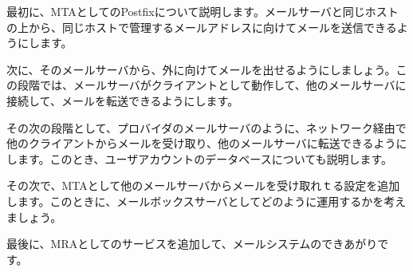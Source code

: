 最初に、MTAとしてのPostfixについて説明します。メールサーバと同じホストの上から、同じホストで管理するメールアドレスに向けてメールを送信できるようにします。

次に、そのメールサーバから、外に向けてメールを出せるようにしましょう。この段階では、メールサーバがクライアントとして動作して、他のメールサーバに接続して、メールを転送できるようにします。

その次の段階として、プロバイダのメールサーバのように、ネットワーク経由で他のクライアントからメールを受け取り、他のメールサーバに転送できるようにします。このとき、ユーザアカウントのデータベースについても説明します。

その次で、MTAとして他のメールサーバからメールを受け取れｔる設定を追加します。このときに、メールボックスサーバとしてどのように運用するかを考えましょう。

最後に、MRAとしてのサービスを追加して、メールシステムのできあがりです。

